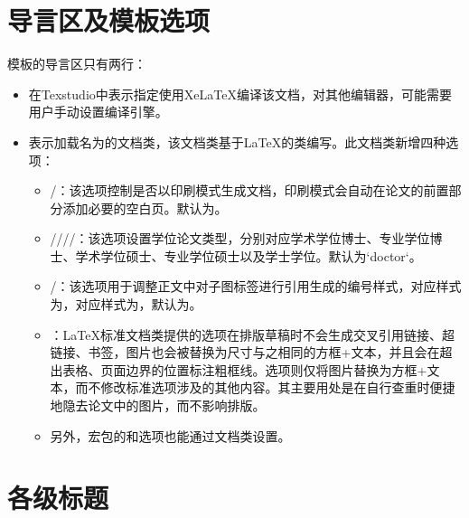 \documentclass[print, doctor, vlined]{DissertUESTC}
\begin{document}
	\section{导言区及模板选项}

	模板的导言区只有两行：
	\begin{itemize}
		\item {}在Texstudio中表示指定使用XeLaTeX编译该文档，对其他编辑器，可能需要用户手动设置编译引擎。

		\item {}表示加载名为的文档类，该文档类基于LaTeX的类编写。此文档类新增四种选项：

		\begin{itemize}
			\item {}/：该选项控制是否以印刷模式生成文档，印刷模式会自动在论文的前置部分添加必要的空白页。默认为。

			\item {}////：该选项设置学位论文类型，分别对应学术学位博士、专业学位博士、学术学位硕士、专业学位硕士以及学士学位。默认为`doctor`。
   
			\item {}/：该选项用于调整正文中对子图标签进行引用生成的编号样式，对应样式为，对应样式为，默认为。
   
			\item {}：LaTeX标准文档类提供的选项在排版草稿时不会生成交叉引用链接、超链接、书签，图片也会被替换为尺寸与之相同的方框+文本，并且会在超出表格、页面边界的位置标注粗框线。选项则仅将图片替换为方框+文本，而不修改标准选项涉及的其他内容。其主要用处是在自行查重时便捷地隐去论文中的图片，而不影响排版。

			\item 另外，\href{https://mirrors.sustech.edu.cn/CTAN/macros/latex/contrib/algorithm2e/doc/algorithm2e.pdf}{}宏包的和选项也能通过文档类设置。
		\end{itemize}
	\end{itemize}
	
	\section{各级标题}
	
\end{document}
